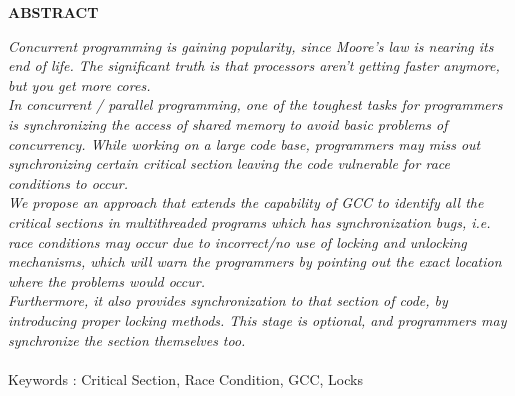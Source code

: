 
\begin{center}
\thispagestyle{empty}
\vspace*{4\baselineskip}
\LARGE{\textbf{ABSTRACT}}\\[1.0cm]
\end{center}
\thispagestyle{empty}
\large{\emph{
\indent\indent Concurrent programming is gaining popularity,
since Moore's law is nearing its end of life. The significant truth
is that processors aren't getting faster anymore, but you get more
cores.\\
\indent\indent In concurrent / parallel programming, one of the toughest
tasks for programmers is synchronizing the access of shared
memory to avoid basic problems of concurrency. While working
on a large code base, programmers may miss out synchronizing
certain critical section leaving the code vulnerable for race
conditions to occur.\\
\indent\indent We propose an approach that extends the capability of GCC to
identify all the critical sections in multithreaded programs which
has synchronization bugs, i.e. race conditions may occur due to
incorrect/no use of locking and unlocking mechanisms, which will
warn the programmers by pointing out the exact location where
the problems would occur.\\
\indent\indent Furthermore, it also provides synchronization to that section of
code, by introducing proper locking methods. This stage is
optional, and programmers may synchronize the section
themselves too.\\
\\[1cm]}}
Keywords : Critical Section, Race Condition, GCC, Locks
